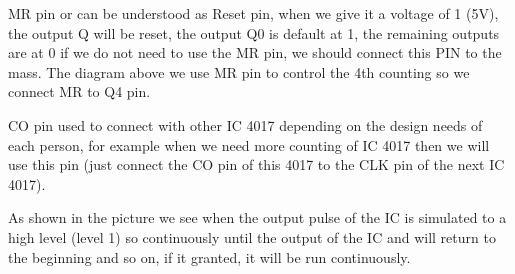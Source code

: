 \documentclass[a4paper]{report}
\begin{document}
        \linebreak
        \par MR pin or can be understood as Reset pin, when we give it a voltage of 1 (5V), the output Q 
        will be reset, the output Q0 is default at 1, the remaining outputs are at 0 if we do not need to use 
        the MR pin, we should connect this PIN to the mass. The diagram above we use MR pin to control 
        the 4th counting so we connect MR to Q4 pin.
        \linebreak
        \par CO pin used to connect with other IC 4017 depending on the design needs of each person, for 
        example when we need more counting of IC 4017 then we will use this pin (just connect the CO pin of this 4017 to the CLK pin of the next IC 4017).
        \linebreak
        \par As shown in the picture we see when the output pulse of the IC is simulated to a high level 
        (level 1) so continuously until the output of the IC and will return to the beginning and so on, 
        if it granted, it will be run continuously.
        \linebreak
\end{document}
